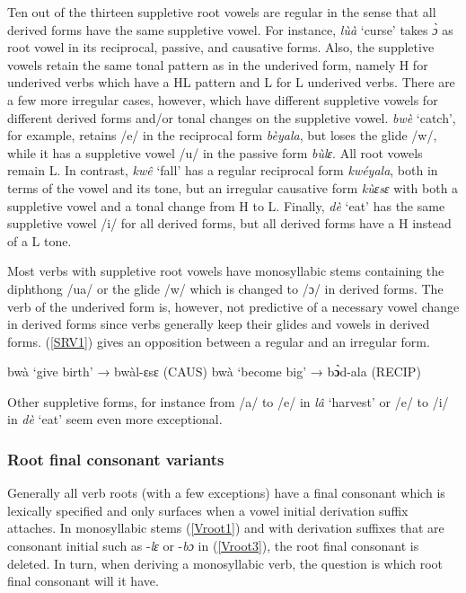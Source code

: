 Ten out of the thirteen suppletive root vowels are regular in the sense that all derived forms have the same suppletive vowel. For instance, {\itshape lùà} `curse' takes {\itshape ɔ̀} as root vowel in its reciprocal, passive, and causative forms. Also, the suppletive vowels retain the same tonal pattern as in the underived form, namely H for underived verbs which have a HL pattern and L for L underived verbs. There are a few more irregular cases, however, which have different suppletive vowels for different derived forms and/or tonal changes on the suppletive vowel. {\itshape bwè} `catch', for example, retains /e/ in the reciprocal form {\itshape bèyala}, but loses the glide /w/, while it has a suppletive vowel /u/ in the passive form {\itshape bùlɛ}. All root vowels remain L. In contrast, {\itshape kwê} `fall' has a regular reciprocal form {\itshape kwéyala}, both in terms of the vowel and its tone, but an irregular causative form {\itshape kùɛsɛ} with both a suppletive vowel and a tonal change from H to L. Finally, {\itshape dè} `eat' has the same suppletive vowel /i/ for all derived forms, but all derived forms have a H instead of a L tone.

Most verbs with suppletive root vowels have monosyllabic stems containing the diphthong /ua/ or the glide /w/ which is changed to /ɔ/ in derived forms. The verb of the underived form is, however, not predictive of a necessary vowel change in derived forms since verbs generally keep their glides and vowels in derived forms. (\ref{SRV1}) gives an opposition between a regular and an irregular form.

\begin{exe}
\ex\label{SRV1}
\begin{xlist}
\ex bwà `give birth' → bwàl-ɛsɛ (CAUS)
\ex bwà `become big' → b{\bfseries ɔ̀}d-ala (RECIP)
\end{xlist}
\end{exe}

\noindent Other suppletive forms, for instance from /a/ to /e/ in {\itshape lâ} `harvest' or /e/ to /i/ in {\itshape dè} `eat' seem even more exceptional.



\subsubsection{Root final consonant variants}
\label{sec:RFCV}

Generally all verb roots (with a few exceptions) have a final consonant which is lexically specified and only surfaces when a vowel initial derivation suffix attaches. In monosyllabic stems (\ref{Vroot1}) and with derivation suffixes that are consonant initial such as -{\itshape lɛ} or -{\itshape bɔ} in (\ref{Vroot3}), the root final consonant is deleted. In turn, when deriving a monosyllabic verb, the question is which root final consonant will it have. 

